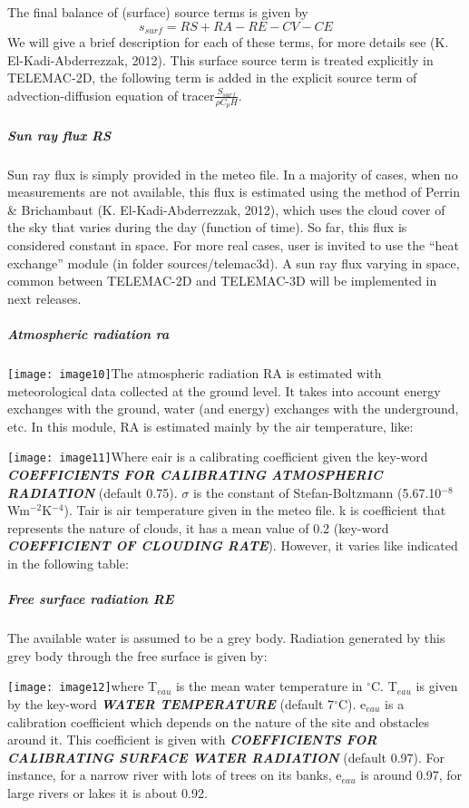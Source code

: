 \documentclass{article} %
\begin{document}
 The final balance of (surface) source terms is given by
\[s_{surf}=RS+RA-RE-CV-CE\]
We will give a brief description for each of these terms, for more details see (K. El-Kadi-Abderrezzak, 2012). This surface source term is treated explicitly in TELEMAC-2D, the following term is added in the explicit source term of advection-diffusion equation of tracer$\frac{S_{surf}}{\rho C_pH}$.


\subparagraph{ Sun ray flux RS}

 Sun ray flux is simply provided in the meteo file. In a majority of cases, when no measurements are not available, this flux is estimated using the method of Perrin \& Brichambaut (K. El-Kadi-Abderrezzak, 2012), which uses the cloud cover of the sky that varies during the day (function of time). So far, this flux is considered constant in space.  For more real cases, user is invited to use the ``heat exchange'' module (in folder sources/telemac3d). A sun ray flux varying in space, common between TELEMAC-2D and TELEMAC-3D will be implemented in next releases.


\subparagraph{ Atmospheric radiation ra}

 \texttt{[image: image10]}The atmospheric radiation RA is estimated with meteorological data collected at the ground level. It takes into account energy exchanges with the ground, water (and energy) exchanges with the underground, etc. In this module, RA is estimated mainly by the air temperature, like:

 \texttt{[image: image11]}Where eair is a calibrating coefficient given the key-word \textbf{\textit{COEFFICIENTS FOR CALIBRATING ATMOSPHERIC RADIATION} }(default 0.75). $\sigma$ is the constant of Stefan-Boltzmann (5.67.10${}^{-8}$ Wm${}^{-2}$K${}^{-4}$). Tair is air temperature given in the meteo file. k is coefficient that represents the nature of clouds, it has a mean value of 0.2 (key-word \textbf{\textit{COEFFICIENT OF CLOUDING RATE}}). However, it varies like indicated in the following table:


\subparagraph{  Free surface radiation RE}

 The available water is assumed to be a grey body. Radiation generated by this grey body through the free surface is given by:

 \texttt{[image: image12]}where T${}_{eau}$ is the mean water temperature in ${}^\circ$C. T${}_{eau}$ is given by the key-word \textbf{\textit{WATER TEMPERATURE}} (default 7${}^\circ$C). e${}_{eau}$ is a calibration coefficient which depends on the nature of the site and obstacles around it. This coefficient is given with \textbf{\textit{COEFFICIENTS FOR CALIBRATING SURFACE WATER RADIATION}} (default 0.97). For instance, for a narrow river with lots of trees on its banks, e${}_{eau}$ is around 0.97, for large rivers or lakes it is about 0.92.
\end{document}
